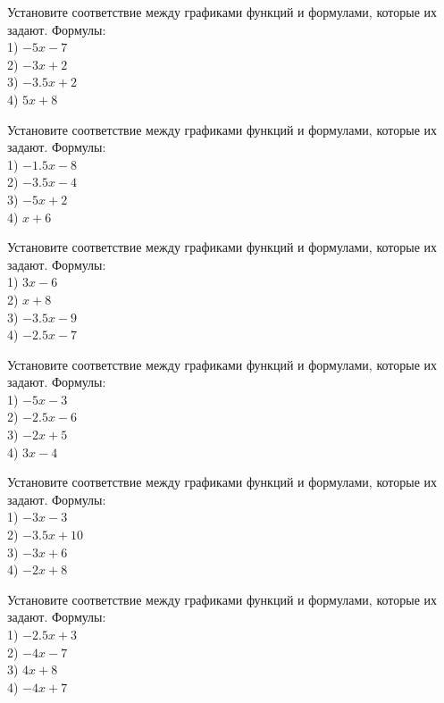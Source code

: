 \documentclass[4apaper]{article}
\begin{document}
\begin{taskBN}{43}
Установите соответствие между графиками функций и формулами, которые их задают. Формулы: \\1) $-5x-7$\\2) $-3x+2$\\3) $-3.5x+2$\\4) $5x+8$
\end{taskBN}

\begin{taskBN}{44}
Установите соответствие между графиками функций и формулами, которые их задают. Формулы: \\1) $-1.5x-8$\\2) $-3.5x-4$\\3) $-5x+2$\\4) $x+6$
\end{taskBN}

\begin{taskBN}{45}
Установите соответствие между графиками функций и формулами, которые их задают. Формулы: \\1) $3x-6$\\2) $x+8$\\3) $-3.5x-9$\\4) $-2.5x-7$
\end{taskBN}

\begin{taskBN}{46}
Установите соответствие между графиками функций и формулами, которые их задают. Формулы: \\1) $-5x-3$\\2) $-2.5x-6$\\3) $-2x+5$\\4) $3x-4$
\end{taskBN}

\begin{taskBN}{47}
Установите соответствие между графиками функций и формулами, которые их задают. Формулы: \\1) $-3x-3$\\2) $-3.5x+10$\\3) $-3x+6$\\4) $-2x+8$
\end{taskBN}

\begin{taskBN}{48}
Установите соответствие между графиками функций и формулами, которые их задают. Формулы: \\1) $-2.5x+3$\\2) $-4x-7$\\3) $4x+8$\\4) $-4x+7$
\end{taskBN}
\end{document}
